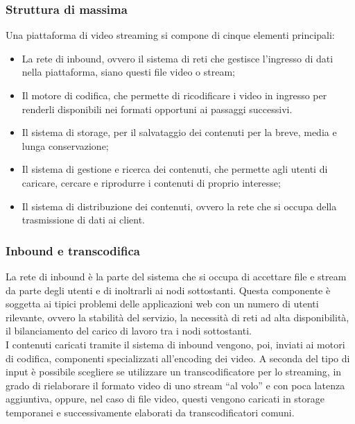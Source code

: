       \subsubsection{Struttura di massima}
      Una piattaforma di video streaming si compone di cinque elementi principali:
      \begin{itemize}
            \item La rete di inbound, ovvero il sistema di reti che gestisce l'ingresso di dati nella piattaforma, siano questi file video o stream;
            \item Il motore di codifica, che permette di ricodificare i video in ingresso per renderli disponibili nei formati opportuni ai passaggi successivi.
            \item Il sistema di storage, per il salvataggio dei contenuti per la breve, media e lunga conservazione;
            \item Il sistema di gestione e ricerca dei contenuti, che permette agli utenti di caricare, cercare e riprodurre i contenuti di proprio interesse;
            \item Il sistema di distribuzione dei contenuti, ovvero la rete che si occupa della trasmissione di dati ai client.
      \end{itemize}

      \subsubsection{Inbound e transcodifica}
      La rete di inbound è la parte del sistema che si occupa di accettare file e stream da parte degli utenti e di inoltrarli ai nodi sottostanti. Questa componente è soggetta ai tipici problemi delle applicazioni web con un numero di utenti rilevante, ovvero la stabilità del servizio, la necessità di reti ad alta disponibilità, il bilanciamento del carico di lavoro tra i nodi sottostanti.
      \\
      I contenuti caricati tramite il sistema di inbound vengono, poi, inviati ai motori di codifica, componenti specializzati all'encoding dei video. A seconda del tipo di input è possibile scegliere se utilizzare un transcodificatore per lo streaming, in grado di rielaborare il formato video di uno stream ``al volo'' e con poca latenza aggiuntiva, oppure, nel caso di file video, questi vengono caricati in storage temporanei e successivamente elaborati da transcodificatori comuni.

